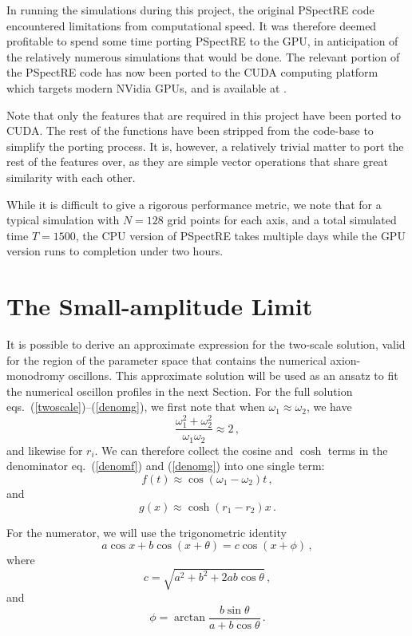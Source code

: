 \documentclass[11pt]{book}
\begin{document}
In running the simulations during this project, the original PSpectRE code encountered limitations from computational speed. It was therefore deemed profitable to spend some time porting PSpectRE to the GPU, in anticipation of the relatively numerous simulations that would be done. The relevant portion of the PSpectRE code has now been ported to the CUDA computing platform which targets modern NVidia GPUs, and is available at \cite{cudaport}.

Note that only the features that are required in this project have been ported to CUDA. The rest of the functions have been stripped from the code-base to simplify the porting process. It is, however, a relatively trivial matter to port the rest of the features over, as they are simple vector operations that share great similarity with each other.

While it is difficult to give a rigorous performance metric, we note that for a typical simulation with $N=128$ grid points for each axis, and a total simulated time $T=1500$, the CPU version of PSpectRE takes multiple days while the GPU version runs to completion under two hours.

\section{The Small-amplitude Limit}
It is possible to derive an approximate expression for the two-scale solution, valid for the region of the parameter space that contains the numerical axion-monodromy oscillons. This approximate solution will be used as an ansatz to fit the numerical oscillon profiles in the next Section. For the full solution eqs.~(\ref{twoscale})--(\ref{denomg}), we first note that when $\omega_1\approx\omega_2$, we have
\begin{equation}
  \frac{\omega_1^2+\omega_2^2}{\omega_1 \omega_2} \approx 2\,,
\end{equation}
and likewise for $r_i$. We can therefore collect the cosine and $\cosh$ terms in the denominator eq.~(\ref{denomf}) and (\ref{denomg}) into one single term:
\begin{equation}
  f(t) \approx \cos (\omega_1-\omega_2) t\,,
\end{equation}
and
\begin{equation}
  g(x) \approx \cosh (r_1-r_2) x\,.
\end{equation}

For the numerator, we will use the trigonometric identity
\begin{equation}
  a\cos x + b \cos(x+\theta) = c \cos(x+\phi)\,,
\end{equation}
where
\begin{equation}
  c = \sqrt{a^2+b^2+2ab\cos\theta}\,,
\end{equation}
and
\begin{equation}
  \phi=\arctan \frac{b\sin\theta}{a+b\cos\theta}\,.
\end{equation}
\end{document}
